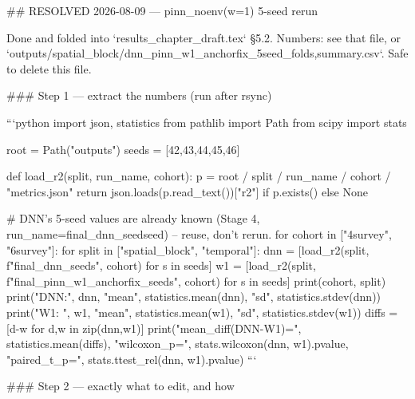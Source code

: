 ## RESOLVED 2026-08-09 — pinn_noenv(w=1) 5-seed rerun

Done and folded into `results_chapter_draft.tex` §5.2. Numbers: see that file, or
`outputs/spatial_block/dnn_pinn_w1_anchorfix_5seed_{folds,summary}.csv`. Safe to delete this file.

### Step 1 — extract the numbers (run after rsync)

```python
import json, statistics
from pathlib import Path
from scipy import stats

root = Path("outputs")
seeds = [42,43,44,45,46]

def load_r2(split, run_name, cohort):
    p = root / split / run_name / cohort / "metrics.json"
    return json.loads(p.read_text())["r2"] if p.exists() else None

# DNN's 5-seed values are already known (Stage 4, run_name=final_dnn_seed{seed}) -- reuse, don't rerun.
for cohort in ["4survey", "6survey"]:
    for split in ["spatial_block", "temporal"]:
        dnn = [load_r2(split, f"final_dnn_seed{s}", cohort) for s in seeds]
        w1 = [load_r2(split, f"final_pinn_w1_anchorfix_seed{s}", cohort) for s in seeds]
        print(cohort, split)
        print("DNN:", dnn, "mean", statistics.mean(dnn), "sd", statistics.stdev(dnn))
        print("W1: ", w1, "mean", statistics.mean(w1), "sd", statistics.stdev(w1))
        diffs = [d-w for d,w in zip(dnn,w1)]
        print("mean_diff(DNN-W1)=", statistics.mean(diffs),
              "wilcoxon_p=", stats.wilcoxon(dnn, w1).pvalue,
              "paired_t_p=", stats.ttest_rel(dnn, w1).pvalue)
```

### Step 2 — exactly what to edit, and how

